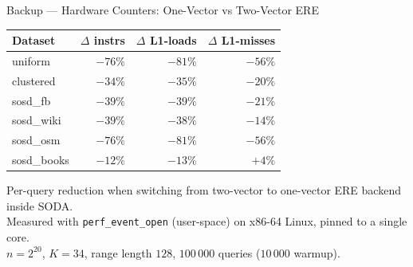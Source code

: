\begin{frame}{Backup --- Hardware Counters: One-Vector vs Two-Vector ERE}
  \centering
  \footnotesize
  \begin{tabular}{@{}lrrr@{}}
    \toprule
    Dataset       & $\Delta$ instrs & $\Delta$ L1-loads & $\Delta$ L1-misses \\
    \midrule
    uniform       & $-76\%$ & $-81\%$ & $-56\%$ \\
    clustered     & $-34\%$ & $-35\%$ & $-20\%$ \\
    sosd\_fb      & $-39\%$ & $-39\%$ & $-21\%$ \\
    sosd\_wiki    & $-39\%$ & $-38\%$ & $-14\%$ \\
    sosd\_osm     & $-76\%$ & $-81\%$ & $-56\%$ \\
    sosd\_books   & $-12\%$ & $-13\%$ & $+4\%$ \\
    \bottomrule
  \end{tabular}

  \vspace{0.8em}
  {\footnotesize
    Per-query reduction when switching from two-vector to one-vector ERE backend inside SODA.\\
    Measured with \texttt{perf\_event\_open} (user-space) on x86-64 Linux, pinned to a single core.\\
    $n = 2^{20}$, $K = 34$, range length $128$, $100\,000$ queries ($10\,000$ warmup).
  }
\end{frame}
